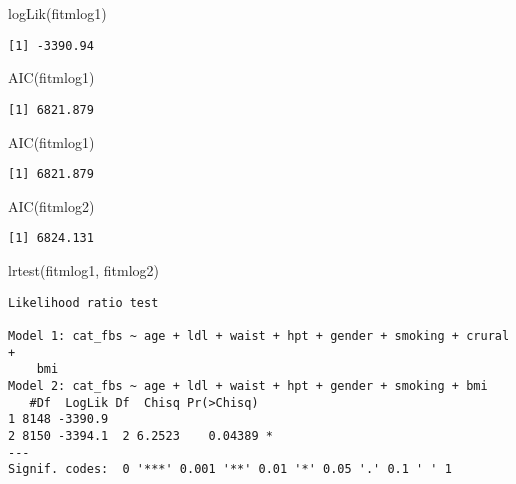 \documentclass[
  letterpaper,
  DIV=11,
  numbers=noendperiod]{scrartcl}
\newenvironment{Shaded}{\begin{snugshade}}{\end{snugshade}}
\newcommand{\FunctionTok}[1]{\textcolor[rgb]{0.28,0.35,0.67}{#1}}
\newcommand{\NormalTok}[1]{\textcolor[rgb]{0.00,0.23,0.31}{#1}}
\begin{document}
\begin{Shaded}
\begin{Highlighting}[]
\FunctionTok{logLik}\NormalTok{(fitmlog1)}
\end{Highlighting}
\end{Shaded}

\begin{verbatim}
[1] -3390.94
\end{verbatim}

\begin{Shaded}
\begin{Highlighting}[]
\FunctionTok{AIC}\NormalTok{(fitmlog1)}
\end{Highlighting}
\end{Shaded}

\begin{verbatim}
[1] 6821.879
\end{verbatim}

\begin{Shaded}
\begin{Highlighting}[]
\FunctionTok{AIC}\NormalTok{(fitmlog1)}
\end{Highlighting}
\end{Shaded}

\begin{verbatim}
[1] 6821.879
\end{verbatim}

\begin{Shaded}
\begin{Highlighting}[]
\FunctionTok{AIC}\NormalTok{(fitmlog2)}
\end{Highlighting}
\end{Shaded}

\begin{verbatim}
[1] 6824.131
\end{verbatim}

\begin{Shaded}
\begin{Highlighting}[]
\FunctionTok{lrtest}\NormalTok{(fitmlog1, fitmlog2)}
\end{Highlighting}
\end{Shaded}

\begin{verbatim}
Likelihood ratio test

Model 1: cat_fbs ~ age + ldl + waist + hpt + gender + smoking + crural + 
    bmi
Model 2: cat_fbs ~ age + ldl + waist + hpt + gender + smoking + bmi
   #Df  LogLik Df  Chisq Pr(>Chisq)  
1 8148 -3390.9                       
2 8150 -3394.1  2 6.2523    0.04389 *
---
Signif. codes:  0 '***' 0.001 '**' 0.01 '*' 0.05 '.' 0.1 ' ' 1
\end{verbatim}
\end{document}
